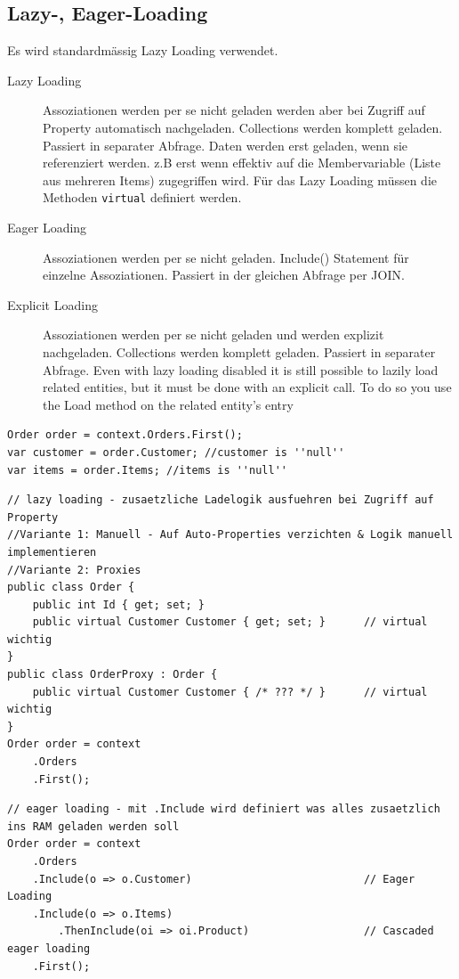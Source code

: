 \documentclass[
a4paper,
oneside,
10pt,
fleqn,
headsepline,
toc=listofnumbered, 
bibliography=totocnumbered]{scrartcl}
\begin{document}
\subsection{Lazy-, Eager-Loading}
Es wird standardmässig Lazy Loading verwendet. 
\begin{description}
	\item[Lazy Loading] Assoziationen werden per se nicht geladen werden aber bei Zugriff auf Property automatisch nachgeladen. Collections werden komplett geladen. Passiert in separater Abfrage.
	Daten werden erst geladen, wenn sie referenziert werden. z.B erst wenn effektiv auf die Membervariable (Liste aus mehreren Items) zugegriffen wird. Für das Lazy Loading müssen die Methoden \lstinline|virtual| definiert werden. 
	\item[Eager Loading] Assoziationen werden per se nicht geladen. Include() Statement für einzelne Assoziationen. Passiert in der gleichen Abfrage per JOIN.
	\item[Explicit Loading] Assoziationen werden per se nicht geladen und werden explizit nachgeladen. Collections werden komplett geladen. Passiert in separater Abfrage.
	Even with lazy loading disabled it is still possible to lazily load related entities, but it must be done with an explicit call. To do so you use the Load method on the related entity’s entry
\end{description}
\begin{lstlisting}
Order order = context.Orders.First();
var customer = order.Customer; //customer is ''null''
var items = order.Items; //items is ''null''
\end{lstlisting}

\begin{lstlisting}
// lazy loading - zusaetzliche Ladelogik ausfuehren bei Zugriff auf Property
//Variante 1: Manuell - Auf Auto-Properties verzichten & Logik manuell implementieren
//Variante 2: Proxies 
public class Order {
    public int Id { get; set; }
    public virtual Customer Customer { get; set; }      // virtual wichtig
}
public class OrderProxy : Order {
    public virtual Customer Customer { /* ??? */ }      // virtual wichtig
}
Order order = context
    .Orders
    .First();
\end{lstlisting}

\begin{lstlisting}
// eager loading - mit .Include wird definiert was alles zusaetzlich ins RAM geladen werden soll
Order order = context
    .Orders
    .Include(o => o.Customer)                           // Eager Loading
    .Include(o => o.Items)
        .ThenInclude(oi => oi.Product)                  // Cascaded eager loading
    .First();
\end{lstlisting}
\end{document}
